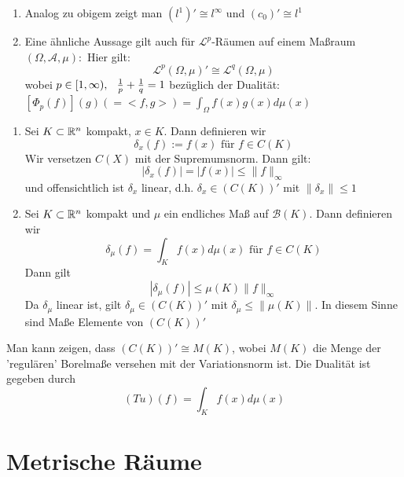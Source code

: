 \begin{bemerkung}
	\begin{enumerate}[label=\alph*\upshape)]
		\item Analog zu obigem zeigt man $(l^{1})' \cong l^{\infty}$ und $(c_{0})' \cong l^{1}$
		\item Eine ähnliche Aussage gilt auch für $\mathcal{L}^{p}$-Räumen auf einem Ma{\ss}raum $(\Omega, \mathcal{A}, \mu):$
			Hier gilt:
			\[ \mathcal{L}^{p}(\Omega, \mu)' \cong \mathcal{L}^{q}(\Omega, \mu) \]
			wobei $p \in [1, \infty), \hspace{0.25cm} \frac{1}{p} + \frac{1}{q} = 1$ bezüglich der Dualität: $[\Phi_{p}(f)](g) (= <f, g>) = \int_{\Omega} f(x) g(x) d\mu(x)$ 
	\end{enumerate}	
\end{bemerkung}

\begin{beispiel}
	\begin{enumerate}[label=\alph*\upshape)]
		\item Sei $K \subset \mathbb{R}^{n}$ kompakt, $x \in K$. Dann definieren wir
			\[ \delta_{x}(f) := f(x) \text{ für } f \in C(K) \]
			Wir versetzen $C(X)$ mit der Supremumsnorm. Dann gilt:
			\[ |\delta_{x}(f)| = | f(x) | \leq \| f \|_{\infty} \]
			und offensichtlich ist $\delta_{x}$ linear, d.h. $\delta_{x} \in ( C(K) )'$ mit $\| \delta_{x} \| \leq 1$
		\item Sei $K \subset \mathbb{R}^{n}$ kompakt und $\mu$ ein endliches Ma{\ss} auf $\mathcal{B}(K)$. Dann definieren wir 
			\[ \delta_{\mu}(f) = \int_{K} f(x) d\mu(x) \text{ für } f \in C(K) \]
			Dann gilt
			\[ | \delta_{\mu} (f) | \leq \mu(K) \| f \| _{\infty} \]
			Da $\delta_{\mu}$ linear ist, gilt $\delta_{\mu}\in (C(K))'$ mit $\delta_{\mu} \leq \| \mu (K) \|$. In diesem Sinne sind Ma{\ss}e Elemente von $(C(K))'$
	\end{enumerate}	
\end{beispiel}

\begin{bemerkung}
	Man kann zeigen, dass $(C(K))' \cong M(K)$, wobei $M(K)$ die Menge der 'regulären' Borelma{\ss}e versehen mit der Variationsnorm ist. Die Dualität ist gegeben durch
	\[ (T u)(f) = \int_{K} f(x) d\mu(x) \]
\end{bemerkung}


\newpage

\section{Metrische R{\"a}ume}

